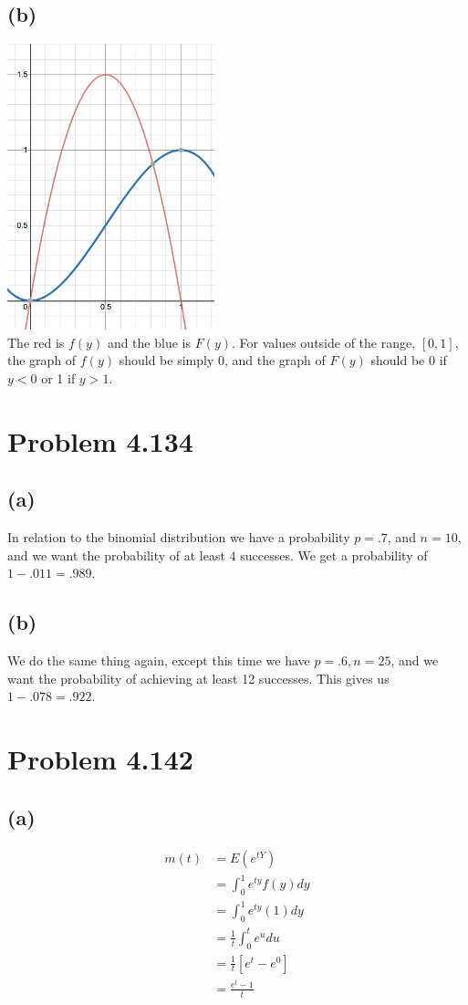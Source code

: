 \documentclass{article}
\theoremstyle{definition}
\begin{document}
    \subsection*{(b)}
    \includegraphics[width=6cm]{graph1}\\
    The red is $f(y)$ and the blue is $F(y)$. For values outside of the range, $[0,1]$, 
    the graph of $f(y)$ should be simply 0, and the graph of $F(y)$ should be 0 if $y < 0$ or 1 if $y > 1$.

\section*{Problem 4.134}
    
    \subsection*{(a)}
        In relation to the binomial distribution we have a probability $p = .7$, and $n = 10$,
        and we want the probability of at least $4$ successes. We get a probability of $1 - .011 = .989$.
    
    \subsection*{(b)}
            We do the same thing again, except this time we have $p = .6, n = 25$, and we want
            the probability of achieving at least 12 successes. This gives us $1 - .078 = .922$.

\section*{Problem 4.142}

    \subsection*{(a)}
        \begin{align*}
            m(t) &= E(e^{t Y})\\
            &= \int_0^1 e^{t y} f(y)dy\\
            &= \int_0^1 e^{t y} (1) dy\\
            &= \frac{1}{t} \int_0^t e^u du\\
            &= \frac{1}{t} [e^t - e^0]\\
            &= \frac{e^t - 1}{t}
        \end{align*}
\end{document}

